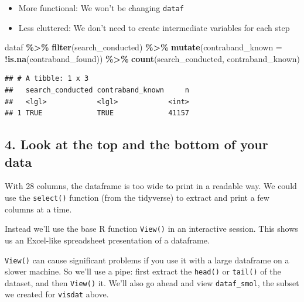 \documentclass[
]{article}
\newenvironment{Shaded}{\begin{snugshade}}{\end{snugshade}}
\newcommand{\DataTypeTok}[1]{\textcolor[rgb]{0.13,0.29,0.53}{#1}}
\newcommand{\KeywordTok}[1]{\textcolor[rgb]{0.13,0.29,0.53}{\textbf{#1}}}
\newcommand{\NormalTok}[1]{#1}
\newcommand{\OperatorTok}[1]{\textcolor[rgb]{0.81,0.36,0.00}{\textbf{#1}}}
\newcommand{\StringTok}[1]{\textcolor[rgb]{0.31,0.60,0.02}{#1}}
\providecommand{\tightlist}{%
  \setlength{\itemsep}{0pt}\setlength{\parskip}{0pt}}
\begin{document}
\begin{itemize}
\begin{itemize}
    \begin{itemize}
    \tightlist
    \item
      More functional: We won't be changing \texttt{dataf}
    \item
      Less cluttered: We don't need to create intermediate variables for each step
    \end{itemize}
  \end{itemize}
\end{itemize}

\begin{Shaded}
\begin{Highlighting}[]
\NormalTok{dataf }\OperatorTok{\%\textgreater{}\%}\StringTok{ }
\StringTok{    }\KeywordTok{filter}\NormalTok{(search\_conducted) }\OperatorTok{\%\textgreater{}\%}\StringTok{ }
\StringTok{    }\KeywordTok{mutate}\NormalTok{(}\DataTypeTok{contraband\_known =} \OperatorTok{!}\KeywordTok{is.na}\NormalTok{(contraband\_found)) }\OperatorTok{\%\textgreater{}\%}\StringTok{ }
\StringTok{    }\KeywordTok{count}\NormalTok{(search\_conducted, contraband\_known)}
\end{Highlighting}
\end{Shaded}

\begin{verbatim}
## # A tibble: 1 x 3
##   search_conducted contraband_known     n
##   <lgl>            <lgl>            <int>
## 1 TRUE             TRUE             41157
\end{verbatim}

\hypertarget{look-at-the-top-and-the-bottom-of-your-data}{%
\subsection{4. Look at the top and the bottom of your data}\label{look-at-the-top-and-the-bottom-of-your-data}}

With 28 columns, the dataframe is too wide to print in a readable way. We could use the \texttt{select()} function (from the tidyverse) to extract and print a few columns at a time.

Instead we'll use the base R function \texttt{View()} in an interactive session. This shows us an Excel-like spreadsheet presentation of a dataframe.

\texttt{View()} can cause significant problems if you use it with a large dataframe on a slower machine. So we'll use a pipe: first extract the \texttt{head()} or \texttt{tail()} of the dataset, and then \texttt{View()} it. We'll also go ahead and view \texttt{dataf\_smol}, the subset we created for \texttt{visdat} above.
\end{document}
